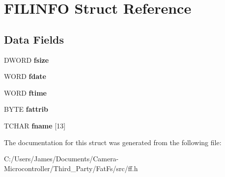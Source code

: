 \hypertarget{struct_f_i_l_i_n_f_o}{}\section{F\+I\+L\+I\+N\+FO Struct Reference}
\label{struct_f_i_l_i_n_f_o}
\subsection*{Data Fields}
\begin{DoxyCompactItemize}
\item 
\mbox{\label{struct_f_i_l_i_n_f_o_af70a0afd16367837984d6205cbfca308}} 
D\+W\+O\+RD {\bfseries fsize}
\item 
\mbox{\label{struct_f_i_l_i_n_f_o_af49edeb97b10af8854cc15a05947a7d4}} 
W\+O\+RD {\bfseries fdate}
\item 
\mbox{\label{struct_f_i_l_i_n_f_o_adb685b4c58c087d1cd790afb710001cb}} 
W\+O\+RD {\bfseries ftime}
\item 
\mbox{\label{struct_f_i_l_i_n_f_o_a8d28e8b20d001f36bf6099d312384fbd}} 
B\+Y\+TE {\bfseries fattrib}
\item 
\mbox{\label{struct_f_i_l_i_n_f_o_a7c33845207b44ca3b394052ad6724e72}} 
T\+C\+H\+AR {\bfseries fname} \mbox{[}13\mbox{]}
\end{DoxyCompactItemize}


The documentation for this struct was generated from the following file\+:\begin{DoxyCompactItemize}
\item 
C\+:/\+Users/\+James/\+Documents/\+Camera-\/\+Microcontroller/\+Third\+\_\+\+Party/\+Fat\+Fs/src/ff.\+h\end{DoxyCompactItemize}
